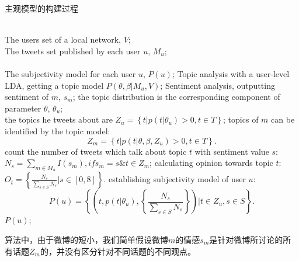 \begin{algorithm}[htb] 
\caption{主观模型的构建过程} 
\label{alg5-1}
\begin{algorithmic}[0] %
\REQUIRE ~~\\ %
The users set of a local network, $ V $;\\
The tweets set published by each user $ u $, $ M_{u} $;\\
\ENSURE ~~\\ %
The subjectivity model for each user $ u $, $ P(u) $;
\STATE Topic analysis with a user-level LDA, getting a topic model $P(\theta,\beta|M_{u},V)$; 
\label{ alg1:topic }%
\label{alg1:sentiment}
\STATE Sentiment analysis, outputting sentiment of $ m $, $ s_{m} $;
\ENDFOR
{}
\STATE the topic distribution is the corresponding component of parameter $ \theta $, $ \theta_{u} $; \\
\STATE the topics he tweets about are $ Z_{u}= \left\lbrace t \vert p\left( t \vert \theta_{u} \right)>0, t \in T \right\rbrace $; 
\ENDFOR
{}
\STATE topics of $ m $ can be identified by the topic model:
\begin{equation}
\label{tweettopic}
Z_{m} =\left\lbrace t \vert p\left( t \vert \theta, \beta, Z_{u} \right)>0, t \in T \right\rbrace.
\end{equation}
\ENDFOR
{}
\STATE count the number of tweets which talk about topic $ t $ with sentiment value $ s $: $ N_{s}=\sum_{m \in M_{u}} I\left( s_{m} \right) ,  if  s_{m}=s \& t \in Z_{m} $;
\ENDFOR
\STATE calculating opinion towards topic $ t $: $ O_{t} = \left\{ \frac{N_{s}}{\sum_{s \in S} N_{s}} |s \in [0,8] \right\}  $.
\ENDFOR
\STATE establishing subjectivity model of user $ u $:
\begin{equation}
\label{subuser}
P\left( u \right)= \left\lbrace \left( t, p\left( t \vert \theta_{u} \right), \left\{ \frac{N_{s}}{\sum_{s \in S} N_{s}} \right\}  \right)  \vert t \in Z_{u}, s \in S  \right\rbrace.
\end{equation}
\RETURN $P(u)$; %
\end{algorithmic}
\end{algorithm}

算法中，由于微博的短小，我们简单假设微博$ m $的情感$ s_m $是针对微博所讨论的所有话题$ Z_{m} $的，并没有区分针对不同话题的不同观点。


